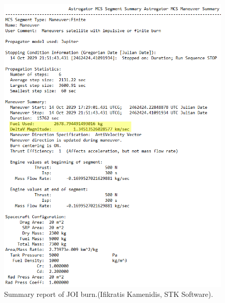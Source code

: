 \begin{figure}[h!]
\centering
\includegraphics[scale=0.5]{figures/Orbiter/JOIres.png}
\caption{Summary report of JOI burn.(Ifikratis Kamenidis, STK Software).}
\end{figure}

